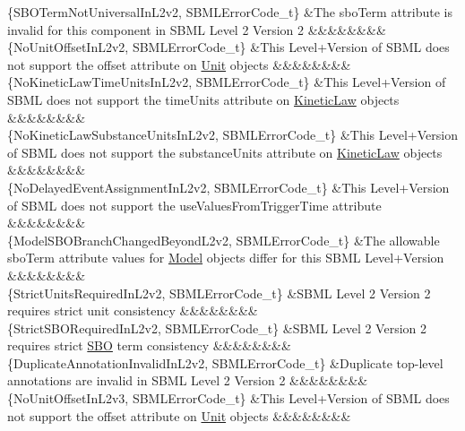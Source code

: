 \begin{DoxyParagraph}{}
\begin{longtabu}
\{S\+B\+O\+Term\+Not\+Universal\+In\+L2v2, S\+B\+M\+L\+Error\+Code\+\_\+t\} &The \textquotesingle{}sbo\+Term\textquotesingle{} attribute is invalid for this component in S\+B\+ML Level 2 Version 2 &&&&&&&&\\
\{No\+Unit\+Offset\+In\+L2v2, S\+B\+M\+L\+Error\+Code\+\_\+t\} &This Level+\+Version of S\+B\+ML does not support the \textquotesingle{}offset\textquotesingle{} attribute on \hyperlink{class_unit}{Unit} objects &&&&&&&&\\
\{No\+Kinetic\+Law\+Time\+Units\+In\+L2v2, S\+B\+M\+L\+Error\+Code\+\_\+t\} &This Level+\+Version of S\+B\+ML does not support the \textquotesingle{}time\+Units\textquotesingle{} attribute on \hyperlink{class_kinetic_law}{Kinetic\+Law} objects &&&&&&&&\\
\{No\+Kinetic\+Law\+Substance\+Units\+In\+L2v2, S\+B\+M\+L\+Error\+Code\+\_\+t\} &This Level+\+Version of S\+B\+ML does not support the \textquotesingle{}substance\+Units\textquotesingle{} attribute on \hyperlink{class_kinetic_law}{Kinetic\+Law} objects &&&&&&&&\\
\{No\+Delayed\+Event\+Assignment\+In\+L2v2, S\+B\+M\+L\+Error\+Code\+\_\+t\} &This Level+\+Version of S\+B\+ML does not support the \textquotesingle{}use\+Values\+From\+Trigger\+Time\textquotesingle{} attribute &&&&&&&&\\
\{Model\+S\+B\+O\+Branch\+Changed\+Beyond\+L2v2, S\+B\+M\+L\+Error\+Code\+\_\+t\} &The allowable \textquotesingle{}sbo\+Term\textquotesingle{} attribute values for \hyperlink{class_model}{Model} objects differ for this S\+B\+ML Level+\+Version &&&&&&&&\\
\{Strict\+Units\+Required\+In\+L2v2, S\+B\+M\+L\+Error\+Code\+\_\+t\} &S\+B\+ML Level 2 Version 2 requires strict unit consistency &&&&&&&&\\
\{Strict\+S\+B\+O\+Required\+In\+L2v2, S\+B\+M\+L\+Error\+Code\+\_\+t\} &S\+B\+ML Level 2 Version 2 requires strict \hyperlink{class_s_b_o}{S\+BO} term consistency &&&&&&&&\\
\{Duplicate\+Annotation\+Invalid\+In\+L2v2, S\+B\+M\+L\+Error\+Code\+\_\+t\} &Duplicate top-\/level annotations are invalid in S\+B\+ML Level 2 Version 2 &&&&&&&&\\
\{No\+Unit\+Offset\+In\+L2v3, S\+B\+M\+L\+Error\+Code\+\_\+t\} &This Level+\+Version of S\+B\+ML does not support the \textquotesingle{}offset\textquotesingle{} attribute on \hyperlink{class_unit}{Unit} objects &&&&&&&&\\

\end{longtabu}
\end{DoxyParagraph}
